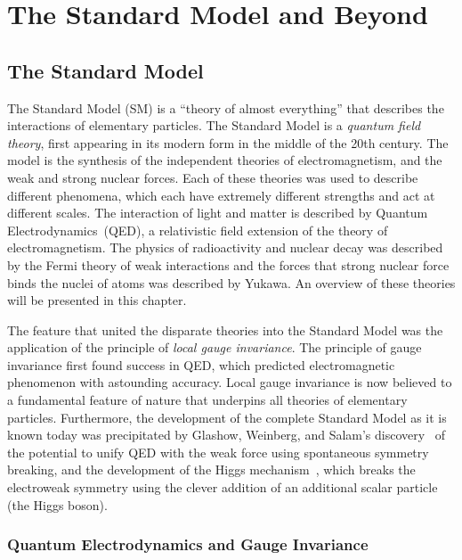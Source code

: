 \ifx\master\undefined\fi

\chapter{The Standard Model and Beyond}
\label{ch:theory}

\section{The Standard Model}

The Standard Model (SM) is a ``theory of almost everything'' that describes the
interactions of elementary particles.  The Standard Model is a \emph{quantum
field theory}, first appearing in its modern form in the middle of the 20th
century.  The model is the synthesis of the independent theories of
electromagnetism, and the weak and strong nuclear forces.  Each of these
theories was used to describe different phenomena, which each have extremely
different strengths and act at different scales.  The interaction of light and
matter is described by Quantum Electrodynamics~(QED), a relativistic field
extension of the theory of electromagnetism.  The physics of radioactivity and
nuclear decay was described by the Fermi theory of weak interactions and the
forces that strong nuclear force binds the nuclei of atoms was described by
Yukawa.  An overview of these theories will be presented in this chapter.  

The feature that united the disparate theories into the Standard Model was the
application of the principle of \emph{local gauge invariance}. The principle of
gauge invariance first found success in QED, which predicted electromagnetic
phenomenon with astounding accuracy.  Local gauge invariance is now believed to
a fundamental feature of nature that underpins all theories of elementary
particles.  Furthermore, the development of the complete Standard Model as it
is known today was precipitated by  Glashow, Weinberg, and Salam's
discovery~\cite{GlashowSymmetryBreaking} of the potential to unify QED with
the weak force using spontaneous symmetry breaking, and the development of the
Higgs mechanism~\cite{HiggsMechanism}, which breaks the electroweak symmetry
using the clever addition of an additional scalar particle (the Higgs boson).

\subsection{Quantum Electrodynamics and Gauge Invariance}
\label{sec:QEDandGaugeInvariance}

